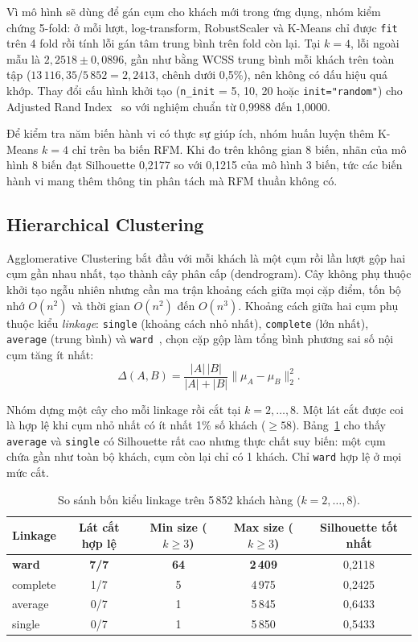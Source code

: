 \documentclass[../report.tex]{subfiles}
\begin{document}
Vì mô hình sẽ dùng để gán cụm cho khách mới trong ứng dụng, nhóm kiểm chứng 5-fold: ở mỗi lượt, log-transform, RobustScaler và K-Means chỉ được \texttt{fit} trên 4 fold rồi tính lỗi gán tâm trung bình trên fold còn lại. Tại $k = 4$, lỗi ngoài mẫu là $2,2518 \pm 0,0896$, gần như bằng WCSS trung bình mỗi khách trên toàn tập ($13\,116,35/5\,852 = 2,2413$, chênh dưới 0,5\%), nên không có dấu hiệu quá khớp. Thay đổi cấu hình khởi tạo (\texttt{n\_init} = 5, 10, 20 hoặc \texttt{init="random"}) cho Adjusted Rand Index~\cite{hubert1985} so với nghiệm chuẩn từ 0,9988 đến 1,0000.

Để kiểm tra năm biến hành vi có thực sự giúp ích, nhóm huấn luyện thêm K-Means $k = 4$ chỉ trên ba biến RFM. Khi đo trên không gian 8 biến, nhãn của mô hình 8 biến đạt Silhouette 0,2177 so với 0,1215 của mô hình 3 biến, tức các biến hành vi mang thêm thông tin phân tách mà RFM thuần không có.

\subsection{Hierarchical Clustering}

Agglomerative Clustering bắt đầu với mỗi khách là một cụm rồi lần lượt gộp hai cụm gần nhau nhất, tạo thành cây phân cấp (dendrogram). Cây không phụ thuộc khởi tạo ngẫu nhiên nhưng cần ma trận khoảng cách giữa mọi cặp điểm, tốn bộ nhớ $O(n^2)$ và thời gian $O(n^2)$ đến $O(n^3)$. Khoảng cách giữa hai cụm phụ thuộc kiểu \emph{linkage}: \texttt{single} (khoảng cách nhỏ nhất), \texttt{complete} (lớn nhất), \texttt{average} (trung bình) và \texttt{ward}~\cite{ward1963}, chọn cặp gộp làm tổng bình phương sai số nội cụm tăng ít nhất:
\begin{equation}
\Delta(A,B) = \frac{|A|\,|B|}{|A|+|B|} \lVert \mu_A - \mu_B \rVert_2^2.
\end{equation}

Nhóm dựng một cây cho mỗi linkage rồi cắt tại $k = 2,\ldots,8$. Một lát cắt được coi là hợp lệ khi cụm nhỏ nhất có ít nhất 1\% số khách ($\ge 58$). Bảng~\ref{tab:linkage} cho thấy \texttt{average} và \texttt{single} có Silhouette rất cao nhưng thực chất suy biến: một cụm chứa gần như toàn bộ khách, cụm còn lại chỉ có 1 khách. Chỉ \texttt{ward} hợp lệ ở mọi mức cắt.

\begin{table}[H]
\centering
\small
\begin{tabular}{@{}lcccc@{}}
\toprule
\textbf{Linkage} & \textbf{Lát cắt hợp lệ} & \textbf{Min size ($k\ge3$)} & \textbf{Max size ($k\ge3$)} & \textbf{Silhouette tốt nhất} \\
\midrule
\textbf{ward} & \textbf{7/7} & \textbf{64} & \textbf{2\,409} & 0,2118 \\
complete & 1/7 & 5 & 4\,975 & 0,2425 \\
average & 0/7 & 1 & 5\,845 & 0,6433 \\
single & 0/7 & 1 & 5\,850 & 0,5433 \\
\bottomrule
\end{tabular}
\caption{So sánh bốn kiểu linkage trên 5\,852 khách hàng ($k = 2,\ldots,8$).}
\label{tab:linkage}
\end{table}
\end{document}
